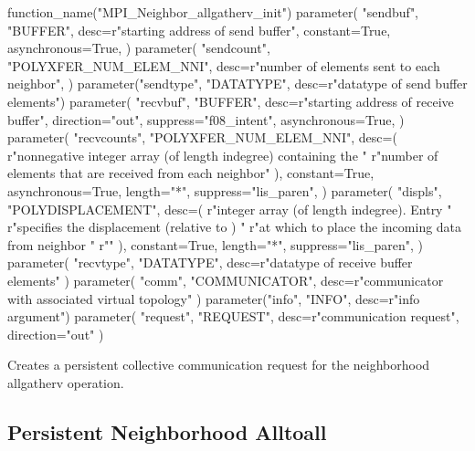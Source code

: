 \begin{mpi-binding}
    function_name("MPI_Neighbor_allgatherv_init")
    parameter(
        "sendbuf",
        "BUFFER",
        desc=r"starting address of send buffer",
        constant=True,
        asynchronous=True,
    )
    parameter(
        "sendcount",
        "POLYXFER_NUM_ELEM_NNI",
        desc=r"number of elements sent to each neighbor",
    )
    parameter("sendtype", "DATATYPE", desc=r"datatype of send buffer elements")
    parameter(
        "recvbuf",
        "BUFFER",
        desc=r"starting address of receive buffer",
        direction="out",
        suppress="f08_intent",
        asynchronous=True,
    )
    parameter(
        "recvcounts",
        "POLYXFER_NUM_ELEM_NNI",
        desc=(
            r"nonnegative integer array (of length indegree) containing the "
            r"number of elements that are received from each neighbor"
        ),
        constant=True,
        asynchronous=True,
        length="*",
        suppress="lis_paren",
    )
    parameter(
        "displs",
        "POLYDISPLACEMENT",
        desc=(
            r"integer array (of length indegree). Entry  "
            r"specifies the displacement (relative to ) "
            r"at which to place the incoming data from neighbor "
            r""
        ),
        constant=True,
        length="*",
        suppress="lis_paren",
    )
    parameter(
        "recvtype", "DATATYPE", desc=r"datatype of receive buffer elements"
    )
    parameter(
        "comm", "COMMUNICATOR", desc=r"communicator with associated virtual topology"
    )
    parameter("info", "INFO", desc=r"info argument")
    parameter(
        "request", "REQUEST", desc=r"communication request", direction="out"
    )
\end{mpi-binding}

%
Creates a persistent collective communication request for the neighborhood allgatherv operation. 


\subsection{Persistent Neighborhood Alltoall}

